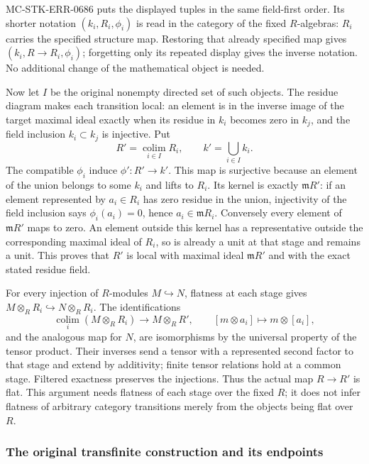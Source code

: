 MC-STK-ERR-0686 puts the displayed tuples in the same field-first order. Its shorter notation \((k_i,R_i,\phi_i)\) is read in the category of the fixed \(R\)-algebras: \(R_i\) carries the specified structure map. Restoring that already specified map gives \((k_i,R\to R_i,\phi_i)\); forgetting only its repeated display gives the inverse notation. No additional change of the mathematical object is needed.

Now let \(I\) be the original nonempty directed set of such objects. The residue diagram makes each transition local: an element is in the inverse image of the target maximal ideal exactly when its residue in \(k_i\) becomes zero in \(k_j\), and the field inclusion \(k_i\subset k_j\) is injective. Put \[
 R'=\operatorname*{colim}_{i\in I}R_i,\qquad k'=\bigcup_{i\in I}k_i.
\] The compatible \(\phi_i\) induce \(\phi':R'\to k'\). This map is surjective because an element of the union belongs to some \(k_i\) and lifts to \(R_i\). Its kernel is exactly \(\mathfrak mR'\): if an element represented by \(a_i\in R_i\) has zero residue in the union, injectivity of the field inclusion says \(\phi_i(a_i)=0\), hence \(a_i\in\mathfrak mR_i\). Conversely every element of \(\mathfrak mR'\) maps to zero. An element outside this kernel has a representative outside the corresponding maximal ideal of \(R_i\), so is already a unit at that stage and remains a unit. This proves that \(R'\) is local with maximal ideal \(\mathfrak mR'\) and with the exact stated residue field.

For every injection of \(R\)-modules \(M\hookrightarrow N\), flatness at each stage gives \(M\otimes_R R_i\hookrightarrow N\otimes_R R_i\). The identifications \[
 \operatorname*{colim}_i(M\otimes_R R_i)\longrightarrow
 M\otimes_R R',\qquad [m\otimes a_i]\longmapsto m\otimes[a_i],
\] and the analogous map for \(N\), are isomorphisms by the universal property of the tensor product. Their inverses send a tensor with a represented second factor to that stage and extend by additivity; finite tensor relations hold at a common stage. Filtered exactness preserves the injections. Thus the actual map \(R\to R'\) is flat. This argument needs flatness of each stage over the fixed \(R\); it does not infer flatness of arbitrary category transitions merely from the objects being flat over \(R\).

\subsubsection{The original transfinite construction and its endpoints}\label{algebra-proof-064-the-original-transfinite-construction-and-its-endpoints}

